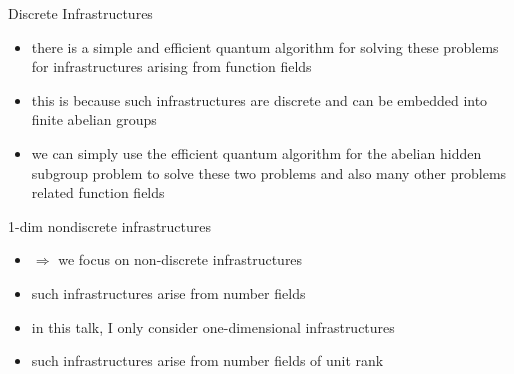 \documentclass[slideColor]{prosper}
\renewcommand{\>}{\rangle}
\newcommand{\<}{\langle}
\begin{document}

\begin{slide}{Discrete Infrastructures}
\begin{itemize}
\item there is a simple and efficient quantum algorithm for solving these problems for infrastructures arising from function fields 

\medskip
\item this is because such infrastructures are discrete and can be embedded into finite abelian groups

\medskip
\item we can simply use the efficient quantum algorithm for the abelian hidden subgroup problem to solve these two problems 
and also many other problems related function fields

\end{itemize}

\end{slide}


\begin{slide}{1-dim nondiscrete infrastructures}
\begin{itemize}

\medskip
\item $\Rightarrow$ we focus on non-discrete infrastructures

\medskip
\item
such infrastructures arise from number fields

\medskip
\item in this talk, I only consider one-dimensional infrastructures

\medskip
\item such infrastructures arise from number fields of unit rank
\end{itemize}

\end{slide}

\end{document}
